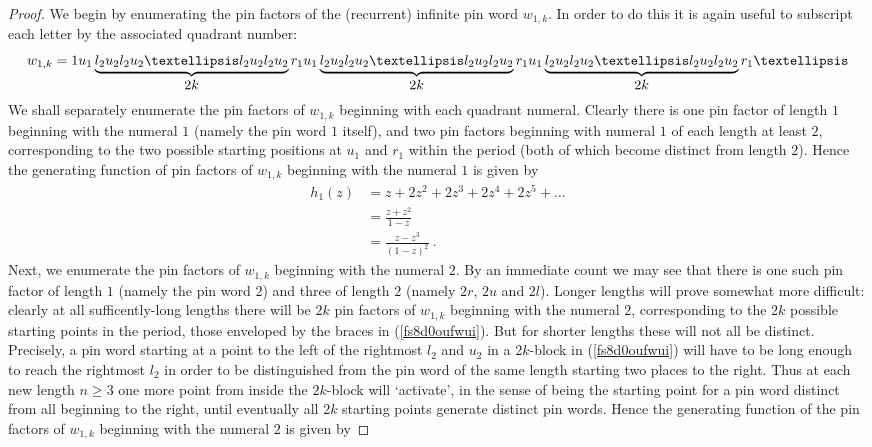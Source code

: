 \documentclass[11pt,a4paper]{article}
\theoremstyle{definition}
\begin{document}
\begin{proof}
We begin by enumerating the pin factors of the (recurrent) infinite pin word $w_{1,k}$. In order to do this it is again useful to subscript each letter by the associated quadrant number:
\begin{equation} \label{fs8d0oufwui}
w_{1,k} = 1u_{1}\underbrace{\mbox{$l_{2}u_{2}l_{2}u_{2}\ldots l_{2}u_{2}l_{2}u_{2}$}}_{\mbox{{\small $2k$}}}r_{1}u_{1}\underbrace{\mbox{$l_{2}u_{2}l_{2}u_{2}\ldots l_{2}u_{2}l_{2}u_{2}$}}_{\mbox{{\small $2k$}}}r_{1}u_{1}\underbrace{\mbox{$l_{2}u_{2}l_{2}u_{2}\ldots l_{2}u_{2}l_{2}u_{2}$}}_{\mbox{{\small $2k$}}}r_{1} \dots
\end{equation}
We shall separately enumerate the pin factors of $w_{1,k}$ beginning with each quadrant numeral. Clearly there is one pin factor of length $1$ beginning with the numeral $1$ (namely the pin word $1$ itself), and two pin factors beginning with numeral $1$ of each length at least $2$, corresponding to the two possible starting positions at $u_{1}$ and $r_{1}$ within the period (both of which become distinct from length $2$). Hence the generating function of pin factors of $w_{1,k}$ beginning with the numeral $1$ is given by
\[
\begin{split}
h_{1}(z) & = z + 2z^2 + 2z^3 + 2z^4 + 2z^5 + \dots\\
 & = \frac{z+z^2}{1 - z} \\
 & = \frac{z-z^3}{(1-z)^2} \ .
\end{split}
\]
Next, we enumerate the pin factors of $w_{1,k}$ beginning with the numeral $2$. By an immediate count we may see that there is one such pin factor of length $1$ (namely the pin word $2$) and three of length $2$ (namely $2r$, $2u$ and $2l$). Longer lengths will prove somewhat more difficult: clearly at all sufficently-long lengths there will be $2k$ pin factors of $w_{1,k}$ beginning with the numeral $2$, corresponding to the $2k$ possible starting points in the period, those enveloped by the braces in (\ref{fs8d0oufwui}). But for shorter lengths these will not all be distinct. Precisely, a pin word starting at a point to the left of the rightmost $l_{2}$ and $u_{2}$ in a $2k$-block in (\ref{fs8d0oufwui}) will have to be long enough to reach the rightmost $l_{2}$ in order to be distinguished from the pin word of the same length starting two places to the right. Thus at each new length $n \geq 3$ one more point from inside the $2k$-block will `activate', in the sense of being the starting point for a pin word distinct from all beginning to the right, until eventually all $2k$ starting points generate distinct pin words. Hence the generating function of the pin factors of $w_{1,k}$ beginning with the numeral $2$ is given by

\end{proof}
\end{document}
